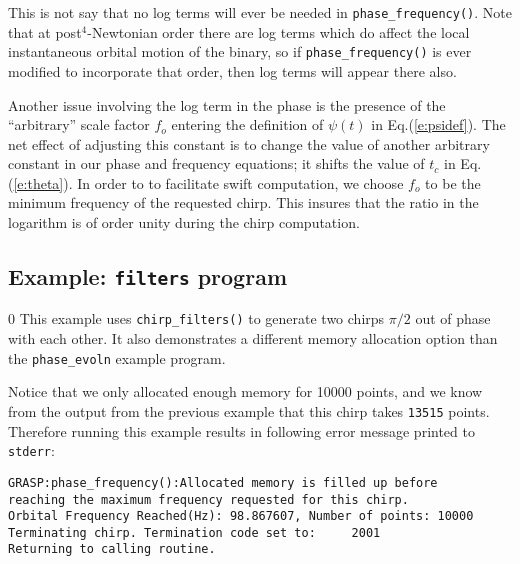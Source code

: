 This is not say that no log terms will ever be needed in 
{\tt phase\_frequency()}. 
Note that at post$^4$-Newtonian
order there are log terms which do affect the local instantaneous
orbital motion of the binary,
so if {\tt phase\_frequency()} is ever modified to 
incorporate that order, then log terms will appear there also.

Another issue involving the log term in the phase is the presence of
the ``arbitrary'' scale factor $f_o$
entering the definition of $\psi (t)$ in Eq.(\ref{e:psidef}).
The net effect of adjusting this constant is to change the value of
another arbitrary constant in our phase and frequency equations;
it shifts the value of $t_c$  in Eq.(\ref{e:theta}).
In order to to facilitate swift computation,
we choose $f_o$ to be the minimum frequency of the 
requested chirp.
This insures that the ratio in the logarithm is of order unity during
the chirp computation.
 \clearpage

\subsection{Example: {\tt filters} program}
\setcounter{equation}0
\label{ss:filters}
This example uses {\tt chirp\_filters()}
to generate two chirps $\pi/2$ out of phase with each other.
It also  demonstrates a different memory allocation option than 
the {\tt phase\_evoln} example program.

Notice that we only allocated enough memory for 10000 points,
and we know from the output from the  previous example that this chirp 
takes {\tt 13515} points. Therefore running this example results
in following error message printed to {\tt stderr}:

\begin{verbatim}
GRASP:phase_frequency():Allocated memory is filled up before
reaching the maximum frequency requested for this chirp.
Orbital Frequency Reached(Hz): 98.867607, Number of points: 10000
Terminating chirp. Termination code set to:     2001
Returning to calling routine.
\end{verbatim}

